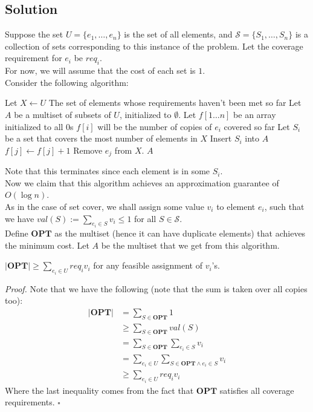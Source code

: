 \documentclass[a4paper]{article}
\newenvironment{proof}{\begin{breakbox}\textit{Proof.}}{\hfill$\square$\end{breakbox}}
\newcommand{\nl}{\vspace{0.2cm}\\}
\newcommand{\OPT}{\mathbf{OPT}}
\begin{document}
\subsection{Solution}
Suppose the set $U = \{e_1, \ldots, e_n\}$ is the set of all elements, and $\mathcal{S} = \{S_1, \ldots, S_n\}$ is a collection of sets corresponding to this instance of the problem. Let the
coverage requirement for $e_i$ be $req_i$.\nl
For now, we will assume that the cost of each set is $1$.\nl
Consider the following algorithm:
\begin{algorithmic}[1]
        \State Let $X \gets U$ \Comment The set of elements whose requirements haven't been met so far
        \State Let $A$ be a multiset of subsets of $U$, initialized to $\emptyset$.
        \State Let $f[1\ldots n]$ be an array initialized to all 0s
        \Comment $f[i]$ will be the number of copies of $e_i$ covered so far
            \State Let $S_i$ be a set that covers the most number of elements in $X$
            \State Insert $S_i$ into $A$
                \State $f[j] \gets f[j] + 1$
                    \State Remove $e_j$ from $X$.
                \EndIf
            \EndFor
        \EndWhile
        \State \Return $A$
    \EndFunction
\end{algorithmic}
Note that this terminates since each element is in some $S_i$.\nl
Now we claim that this algorithm achieves an approximation guarantee of $O(\log n)$.\nl
As in the case of set cover, we shall assign some value $v_i$ to element $e_i$, such that we have $val(S) := \sum_{e_i \in S} v_i \le 1$ for all $S \in \mathcal{S}$.\nl
Define $\OPT$ as the multiset (hence it can have duplicate elements) that achieves the minimum cost. Let $A$ be the multiset that we get from this algorithm.\nl
\begin{claim}
    $|\OPT| \ge \sum_{e_i \in U} req_i v_i$ for any feasible assignment of $v_i$'s.
\end{claim}
\begin{proof}
    Note that we have the following (note that the sum is taken over all copies too):
    \begin{align*}
        |\OPT| &= \sum_{S \in \OPT} 1\\
               &\ge \sum_{S \in \OPT} val(S)\\
               &= \sum_{S \in \OPT} \sum_{e_i \in S} v_i\\
               &= \sum_{e_i \in U} \sum_{S\in \OPT \land e_i \in S} v_i\\
               &\ge \sum_{e_i \in U} req_i v_i
    \end{align*}
    Where the last inequality comes from the fact that $\OPT$ satisfies all coverage requirements.
\end{proof}
\end{document}
